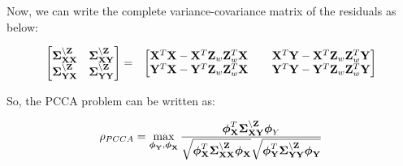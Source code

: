 \documentclass{llncs}
\newcommand{\X}{{\bf X}}
\newcommand{\Y}{{\bf Y}}
\newcommand{\Z}{{\bf Z}}
\newcommand{\bs}{\boldsymbol}
\newcommand{\bSigma}{\boldsymbol \Sigma}
\begin{document}
Now, we can write the complete variance-covariance matrix of the residuals as below:

\begin{eqnarray}
\label{matrices}
\begin{bmatrix}
 \bs\Sigma_{\X\X}^{\backslash \Z} & \bs\Sigma_{\X\Y}^{\backslash \Z} \\
  \bs\Sigma_{\Y\X}^{\backslash \Z} & \bs\Sigma_{\Y\Y}^{\backslash \Z} 
\end{bmatrix}
&=&
\begin{bmatrix}
  \X^T\X -\X^T \Z_w\Z_w^T\X &\;\;\;\;   \X^T\Y -\X^T \Z_w\Z_w^T\Y\\
  \Y^T\X -\Y^T \Z_w\Z_w^T\X &\;\;\;\;   \Y^T\Y -\Y^T \Z_w\Z_w^T\Y
\end{bmatrix}
\end{eqnarray}






So, the PCCA problem can be written as:

\begin{equation}
\label{pscca}
\rho_{PCCA}=\max_{{\bs\phi_{\Y}}, {\bs\phi_{\X}}} \frac{\bs\phi_{\X}^T \bs\Sigma_{\X\Y}^{\backslash \Z}\bs\phi_Y}{\sqrt{\bs\phi_{\X}^T\bs\Sigma_{\X\X}^{\backslash \Z}\bs\phi_{\X}}\sqrt{\bs\phi_{\Y}^T\bs\Sigma_{\Y\Y}^{\backslash \Z}\bs\phi_{\Y}}}
\end{equation}
\end{document}
